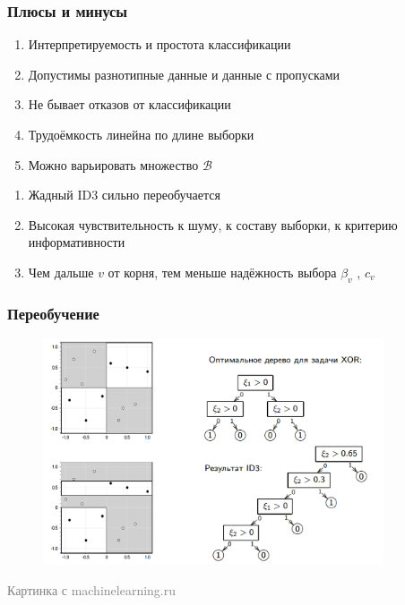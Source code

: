 \documentclass[12pt]{beamer}
\begin{document}
\begin{frame}\frametitle{Плюсы и минусы}
\begin{enumerate}[+]
\item Интерпретируемость и простота классификации
\item Допустимы разнотипные данные и данные с пропусками
\item Не бывает отказов от классификации
\item Трудоёмкость линейна по длине выборки
\item Можно варьировать множество $\mathcal{B}$
\end{enumerate}
\begin{enumerate}[-]
\item Жадный ID3 сильно переобучается
\item Высокая чувствительность к шуму, к составу выборки, к критерию информативности
\item Чем дальше $v$ от корня, тем меньше надёжность выбора $\beta_v$ , $c_v$
\end{enumerate}
\end{frame}

\begin{frame}\frametitle{Переобучение}
\begin{figure}[htbp]
  \includegraphics[height=190pt, keepaspectratio = true]{images/overfitting}   
\end{figure}
\vspace{5mm}
\footnotesize\textcolor{gray} {Картинка с machinelearning.ru}
\end{frame}
\end{document}
